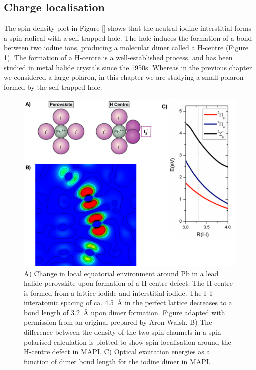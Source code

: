 \subsection{Charge localisation} \label{ss:chglocal}
The spin-density plot in Figure \ref{} shows that the neutral iodine interstitial forms a spin-radical with a self-trapped hole.
The hole induces the formation of a bond between two iodine ions, producing a molecular dimer called a H-centre (Figure \ref{spin_localisation}). The formation of a H-centre is a well-established process, and has been studied in metal halide crystals since the 1950s.\autocite{} %
Whereas in the previous chapter we considered a large polaron, in this chapter we are studying a small polaron formed by the self trapped hole.

\begin{figure}[h!]   %
\centering
  \includegraphics[width=0.9\columnwidth]{figures/ch6/spin_localisation.png}
  \caption[Spin localisation and optical excitation at the H-centre defect in MAPI]{A) Change in local equatorial environment around Pb in a lead halide perovskite upon formation of a H-centre defect. The H-centre is formed from a lattice iodide and interstitial iodide. The I--I interatomic spacing of ca. \SI{4.5}{\angstrom} in the perfect lattice decreases to a bond length of \SI{3.2}{\angstrom} upon dimer formation. Figure adapted with permission from an original prepared by Aron Walsh. B)  The difference between the density of the two spin channels in a spin-polarised calculation is plotted to show spin localisation around the H-centre defect in MAPI. C) Optical excitation energies as a function of dimer bond length for the iodine dimer in MAPI.}
\label{spin_localisation}
\end{figure}

